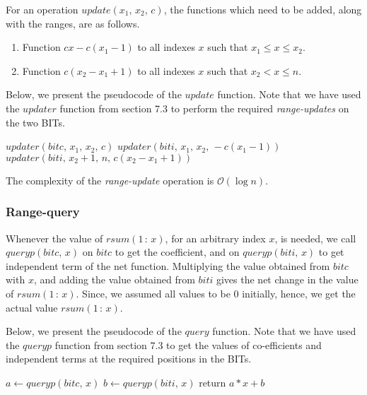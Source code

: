 \documentclass[a4paper]{article}
\begin{document}
\vspace{2 mm}
For an operation $update(x_1,\, x_2,\, c)$, the functions which need to be added, along with the ranges, are as follows.

\begin{enumerate}
\item Function $cx - c(x_1-1)$ to all indexes $x$ such that $x_1 \leq x \leq x_2$.
\item Function $c(x_2-x_1+1)$ to all indexes $x$ such that $x_2 < x \leq n$.
\end{enumerate}

Below, we present the pseudocode of the $update$ function. Note that we have used the $updater$ function from section 7.3 to perform the required \textit{range-updates} on the two BITs.

\vspace {3 mm}
\noindent
{}
\begin{algorithmic}[1]

        \State $updater(bitc,\, x_1,\, x_2,\, c)$
        \State $updater(biti,\, x_1,\, x_2,\, -c(x_1-1))$
        \State $updater(biti,\, x_2+1,\, n,\, c(x_2-x_1+1))$
\EndFunction
\end{algorithmic}

\vspace{3 mm}
The complexity of the \textit{range-update} operation is $\mathcal{O}(\log n)$.

\subsubsection{Range-query}
Whenever the value of $rsum(1\, : \,x)$, for an arbitrary index $x$, is needed, we call $queryp(bitc,\, x)$ on $bitc$ to get the coefficient, and on $queryp(biti,\, x)$ to get independent term of the net function. Multiplying the value obtained from $bitc$ with $x$, and adding the value obtained from $biti$ gives the net change in the value of $rsum(1\, : \,x)$. Since, we assumed all values to be 0 initially, hence, we get the actual value $rsum(1\, : \,x)$.

\vspace{2 mm}
Below, we present the pseudocode of the $query$ function. Note that we have used the $queryp$ function from section 7.3 to get the values of co-efficients and independent terms at the required positions in the BITs.

\vspace {3 mm}
\noindent
{}
\begin{algorithmic}[1]

        \State $a \gets queryp(bitc,\, x)$
        \State $b \gets queryp(biti,\, x)$
        \State return $a*x + b$
\EndFunction
\end{algorithmic}
\end{document}
